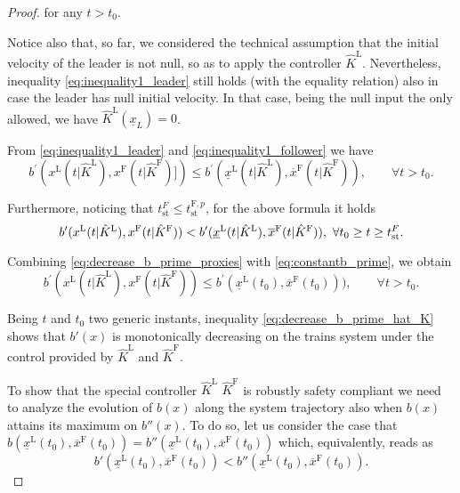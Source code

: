 \documentclass[letterpaper, 10 pt, conference]{ieeeconf}
\theoremstyle{definition}
\theoremstyle{nopoint}
\begin{document}
\begin{proof}
	for any $t>t_0$.
	
	Notice also that, so far, we considered the technical assumption that the initial velocity of the leader is not null, so as to apply the controller $\hat{K}^\mathrm{L}$. Nevertheless, inequality \eqref{eq:inequality1_leader} still holds (with the equality relation) also in case the leader has null initial velocity. In that case, being the null input the only allowed, we have $\hat{K}^\mathrm{L}(\underline{x}_L)=0$.
	
	From \eqref{eq:inequality1_leader} and \eqref{eq:inequality1_follower} we have 
	\begin{equation}\label{eq:decrease_b_prime_proxies}
		b^\prime(x^\mathrm{L}(t | \hat{K}^\mathrm{L}),x^\mathrm{F}(t |\hat{K}^\mathrm{F})])\leq  b^\prime(\underline{x}^\mathrm{L}(t | \hat{K}^\mathrm{L}),\overline{x}^\mathrm{F}(t | \hat{K}^\mathrm{F})), \qquad \forall t>t_0. 
	\end{equation}
	
	Furthermore, noticing that $t_{\mathrm{st}}^{F}\leq t_{\mathrm{st}}^{\mathrm{F},p}$, for the above formula it holds
	\begin{equation*}
		b^\prime(x^\mathrm{L}(t | \hat{K}^\mathrm{L}),x^\mathrm{F}(t |\hat{K}^\mathrm{F}))<  b^\prime(\underline{x}^\mathrm{L}(t | \hat{K}^\mathrm{L}),\overline{x}^\mathrm{F}(t | \hat{K}^\mathrm{F})), \,\, \forall t_0\geq t\geq t_{\mathrm{st}}^{F} \\ . 
	\end{equation*}
	
	
	Combining \eqref{eq:decrease_b_prime_proxies}  with \eqref{eq:constantb_prime}, we obtain 
	\begin{equation}\label{eq:decrease_b_prime_hat_K}
		b^\prime(x^\mathrm{L}(t | \hat{K}^\mathrm{L}),x^\mathrm{F}(t | \hat{K}^\mathrm{F}))\leq b^\prime(\underline{x}^\mathrm{L}(t_0),\overline{x}^\mathrm{F}(t_0))), \qquad \forall t>t_0. 
	\end{equation}
	
	Being $t$ and $t_0$ two generic instants, inequality \eqref{eq:decrease_b_prime_hat_K} shows that $b'(x)$ is monotonically decreasing on the trains system under the control provided by $\hat{K}^\mathrm{L}$ and  $\hat{K}^\mathrm{F}$.
	
	To show that the special controller $\hat{K}^\mathrm{L}$ $\hat{K}^\mathrm{F}$ is robustly safety compliant
	we need to analyze the evolution of $b(x)$ along the system trajectory also when $b(x)$ attains its maximum on $b''(x)$. 
	To do so, let us consider the case that $b(\underline{x}^\mathrm{L}(t_0),\overline{x}^\mathrm{F}(t_0))=b''(\underline{x}^\mathrm{L}(t_0),\overline{x}^\mathrm{F}(t_0))$ which, equivalently, reads as
	\begin{equation}\label{eq:comparison_b_prime_b_second}
		b'(\underline{x}^\mathrm{L}(t_0),\overline{x}^\mathrm{F}(t_0)) <b''(\underline{x}^\mathrm{L}(t_0),\overline{x}^\mathrm{F}(t_0)).
	\end{equation} 
	

\end{proof}
\end{document}
